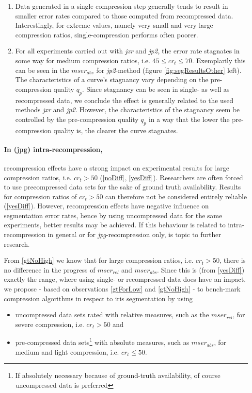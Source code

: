 \documentclass[10pt,twocolumn,letterpaper]{article}
\begin{document}
\begin{enumerate}
 \begin{enumerate}
 	 	\item Data generated in a single compression step generally tends to result in smaller error rates compared to those computed from recompressed data. Interestingly, for extreme values, namely very small and very large compression ratios, single-compression performs often poorer. \label{singleAmongBest}
 	 	
 	 	\item For all experiments carried out with \emph{jxr} and \emph{jp2}, the error rate stagnates in some way for medium compression ratios, i.e. $45 \leq cr_t \leq 70$. Exemplarily this can be seen in the $mser_{abs}$ for \emph{jp2}-method (figure \ref{fig:segResultsOther} left). The characteristics of a curve's stagnancy vary depending on the pre-compression quality $q_p$. Since stagnancy can be seen in single- as well as recompressed data, we conclude the effect is generally related to the used methods \emph{jxr} and \emph{jp2}. However, the characteristics of the stagnancy seem be controlled by the pre-compression quality $q_p$ in a way that the lower the pre-compression quality is, the clearer the curve stagnates. \label{cureFlattening}
\end{enumerate}  
  \end{enumerate}
 
\paragraph{In (jpg) intra-recompression,} recompression effects have a strong impact on experimental results for large compression ratios, i.e. $cr_t > 50$ (\ref{noDiff}, \ref{yesDiff}). Researchers are often forced to use precompressed data sets for the sake of ground truth availability. Results for compression ratios of $cr_t > 50$ can therefore not be considered entirely reliable (\ref{yesDiff}). However, recompression effects have negative influence on segmentation error rates, hence by using uncompressed data for the same experiments, better results may be achieved. If this behaviour is related to intra-recompression in general or for \emph{jpg}-recompression only, is topic to further research.

From \ref{gtNoHigh} we know that for large compression ratios, i.e. $cr_t > 50$, there is no difference in the progress of $mser_{rel}$ and $mser_{abs}$. Since this is (from \ref{yesDiff}) exactly the range, where using single- or recompressed data does have an impact, we propose - based on observations \ref{gtForLow} and \ref{gtNoHigh} - to bench-mark compression algorithms in respect to iris segmentation by using 
\begin{itemize}
	\item uncompressed data sets rated with relative measures, such as the $mser_{rel}$, for severe compression, i.e. $cr_t > 50$ and
	\item pre-compressed data sets\footnote{If absolutely necessary because of ground-truth availability, of course uncompressed data is preferred} with absolute measures, such as $mser_{abs}$, for medium and light compression, i.e. $cr_t \leq 50$.
\end{itemize}
\end{document}
